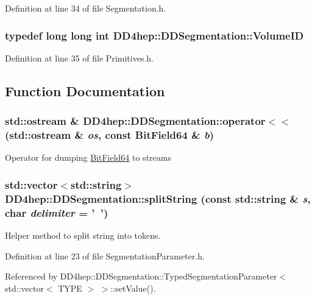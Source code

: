 Definition at line 34 of file Segmentation.h.\hypertarget{namespace_d_d4hep_1_1_d_d_segmentation_a61a6833a18d1800bdef176595f83e3ba}{
\subsubsection[{VolumeID}]{\setlength{\rightskip}{0pt plus 5cm}typedef long long int {\bf DD4hep::DDSegmentation::VolumeID}}}
\label{namespace_d_d4hep_1_1_d_d_segmentation_a61a6833a18d1800bdef176595f83e3ba}


Definition at line 35 of file Primitives.h.

\subsection{Function Documentation}
\hypertarget{namespace_d_d4hep_1_1_d_d_segmentation_a113bdacd047bf42526854d70d3d8ff8b}{
\subsubsection[{operator$<$$<$}]{\setlength{\rightskip}{0pt plus 5cm}std::ostream \& DD4hep::DDSegmentation::operator$<$$<$ (std::ostream \& {\em os}, \/  const BitField64 \& {\em b})}}
\label{namespace_d_d4hep_1_1_d_d_segmentation_a113bdacd047bf42526854d70d3d8ff8b}
Operator for dumping \hyperlink{class_d_d4hep_1_1_d_d_segmentation_1_1_bit_field64}{BitField64} to streams \hypertarget{namespace_d_d4hep_1_1_d_d_segmentation_a23185d1ff8004471cee193fe6bd946c9}{
\subsubsection[{splitString}]{\setlength{\rightskip}{0pt plus 5cm}std::vector$<$std::string$>$ DD4hep::DDSegmentation::splitString (const std::string \& {\em s}, \/  char {\em delimiter} = {\ttfamily '~'})}}
\label{namespace_d_d4hep_1_1_d_d_segmentation_a23185d1ff8004471cee193fe6bd946c9}


Helper method to split string into tokens. 

Definition at line 23 of file SegmentationParameter.h.

Referenced by DD4hep::DDSegmentation::TypedSegmentationParameter$<$ std::vector$<$ TYPE $>$ $>$::setValue().